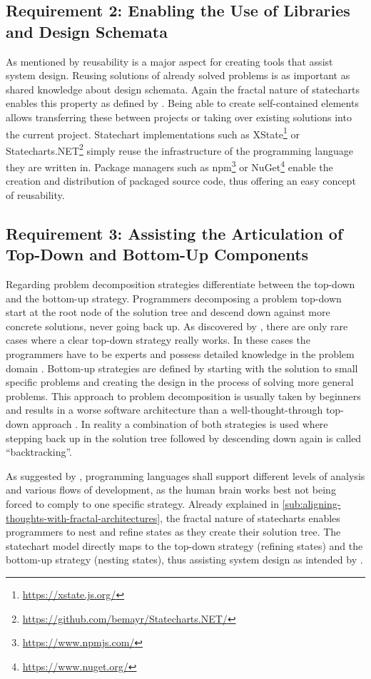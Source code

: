 \subsection{Requirement 2: Enabling the Use of Libraries and Design Schemata}
As mentioned by \textcite{visser_expert_1990} reusability is a major aspect for creating tools that assist system design.
Reusing solutions of already solved problems is as important as shared knowledge about design schemata.
Again the fractal nature of statecharts enables this property as defined by \citeauthor{visser_expert_1990}.
Being able to create self-contained elements allows transferring these between projects or taking over existing solutions into the current project.
Statechart implementations such as XState\footnote{\url{https://xstate.js.org/}} or Statecharts.NET\footnote{\url{https://github.com/bemayr/Statecharts.NET/}} simply reuse the infrastructure of the programming language they are written in.
Package managers such as npm\footnote{\url{https://www.npmjs.com/}} or NuGet\footnote{\url{https://www.nuget.org/}} enable the creation and distribution of packaged source code, thus offering an easy concept of reusability.

\subsection{Requirement 3: Assisting the Articulation of Top-Down and Bottom-Up Components}
Regarding problem decomposition strategies \textcite{visser_expert_1990} differentiate between the top-down and the bottom-up strategy.
Programmers decomposing a problem top-down start at the root node of the solution tree and descend down against more concrete solutions, never going back up.
As discovered by \textcite{brooks_towards_1977}, there are only rare cases where a clear top-down strategy really works.
In these cases the programmers have to be experts and possess detailed knowledge in the problem domain \autocite{dutke_mentale_1994}.
Bottom-up strategies are defined by starting with the solution to small specific problems and creating the design in the process of solving more general problems.
This approach to problem decomposition is usually taken by beginners and results in a worse software architecture than a well-thought-through top-down approach \autocite{visser_expert_1990}.
In reality a combination of both strategies is used where stepping back up in the solution tree followed by descending down again is called ``backtracking''.

As suggested by \textcite{visser_expert_1990}, programming languages shall support different levels of analysis and various flows of development, as the human brain works best not being forced to comply to one specific strategy.
Already explained in \cref{sub:aligning-thoughts-with-fractal-architectures}, the fractal nature of statecharts enables programmers to nest and refine states as they create their solution tree.
The statechart model directly maps to the top-down strategy (refining states) and the bottom-up strategy (nesting states), thus assisting system design as intended by \textcite{visser_expert_1990}.

